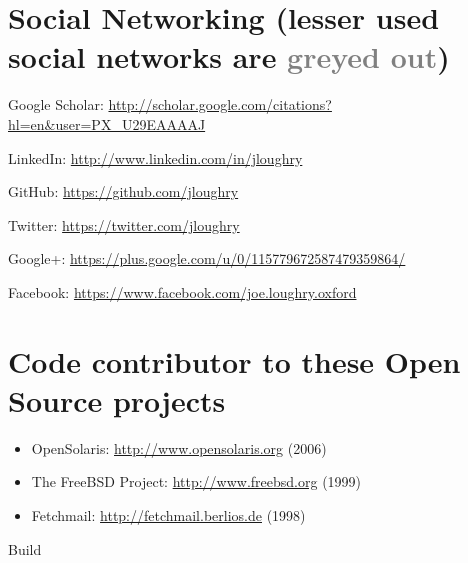 \documentclass[letterpaper]{article}
\begin{document}

\section*{Social Networking {\small (lesser used social networks are \textcolor{grey}{greyed out})}}



\begin{itemize}
	\item Google Scholar: \url{http://scholar.google.com/citations?hl=en&user=PX_U29EAAAAJ}
	\item LinkedIn: \url{http://www.linkedin.com/in/jloughry}
	\item GitHub: \url{https://github.com/jloughry}
	{\color{grey}
		\item Twitter: \url{https://twitter.com/jloughry}
		\item Google+: \url{https://plus.google.com/u/0/115779672587479359864/}
		\item Facebook: \url{https://www.facebook.com/joe.loughry.oxford}
	}
\end{itemize}

\section*{Code contributor to these Open Source projects}

\begin{itemize}
	\item OpenSolaris: \url{http://www.opensolaris.org} (2006)
	\item The FreeBSD Project: \url{http://www.freebsd.org} (1999)
	\item Fetchmail: \url{http://fetchmail.berlios.de} (1998)
\end{itemize}

\vfill
{\tiny Build }
\end{document}
